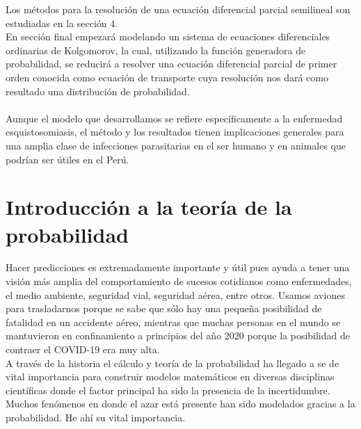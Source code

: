 \documentclass[a4paper,11pt]{book}
\begin{document}
Los métodos para la resolución de una ecuación diferencial parcial semilineal son estudiadas en la sección 4.\\
En sección final empezará modelando un sistema de ecuaciones diferenciales ordinarias de Kolgomorov, la cual, utilizando la función generadora de probabilidad, se reducirá a resolver una ecuación diferencial parcial de primer orden conocida como ecuación de transporte cuya resolución nos dará como resultado una distribución de probabilidad.\\ \\
Aunque el modelo que desarrollamos se refiere específicamente a la enfermedad esquistosomiasis, el método y los resultados tienen implicaciones generales para una amplia clase de infecciones parasitarias en el ser humano y en animales que podrían ser útiles en el Perú.
\chapter{Introducción a la teoría de la probabilidad}
    Hacer predicciones es extremadamente importante y útil pues ayuda a tener una visión más amplia del comportamiento de sucesos cotidianos como enfermedades, el medio ambiente, seguridad vial, seguridad aérea, entre otros.
    Usamos aviones para trasladarnos porque se sabe que sólo hay una pequeña posibilidad de fatalidad en un accidente aéreo, mientras que muchas personas en el mundo se mantuvieron en confinamiento a principios del año 2020 porque la posibilidad de contraer el COVID-19 era muy alta.\\
    A través de la historia el cálculo y teoría de la probabilidad ha llegado a se de vital importancia para construir modelos matemáticos en diversas disciplinas científicas donde el factor principal ha sido la presencia de la incertidumbre.\\
    Muchos fenómenos en donde el azar está presente han sido modelados gracias a la probabilidad. He ahí su vital importancia.
    
    
    
    
    
    
\end{document}
